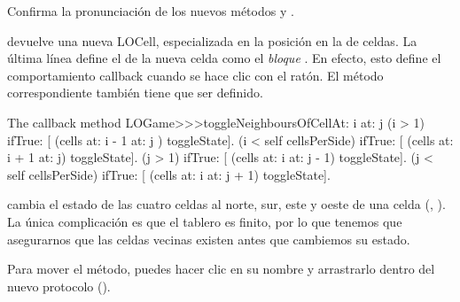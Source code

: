 \documentclass[a4paper,10pt,twoside]{book}
\begin{document}
Confirma la pronunciaci\'on de los nuevos m\'etodos  y .

 devuelve una nueva LOCell, especializada en la posici\'on  en la  de celdas.
La \'ultima l\'inea define el  de la nueva celda como el \emph{bloque}
\mbox{.}
En efecto, esto define el comportamiento callback cuando se hace clic con el rat\'on. 
El m\'etodo correspondiente tambi\'en tiene que ser definido. 

\begin{method}[toggleNeighboursOfCellAt:at:]{The callback method}
LOGame>>>toggleNeighboursOfCellAt: i at: j
   (i > 1) ifTrue: [ (cells at: i - 1 at: j ) toggleState].
   (i < self cellsPerSide) ifTrue: [ (cells at: i + 1 at: j) toggleState].
   (j > 1) ifTrue: [ (cells at: i  at: j - 1) toggleState].
   (j < self cellsPerSide) ifTrue: [ (cells at: i at: j + 1) toggleState].
\end{method}

 cambia el estado de las cuatro celdas al norte, sur, este y oeste de una celda (, ). La \'unica complicaci\'on es que el tablero es finito, por lo que tenemos que asegurarnos que las celdas vecinas existen antes que cambiemos su estado. 

Para mover el m\'etodo, puedes hacer clic en su nombre y arrastrarlo dentro del nuevo protocolo ().
\end{document}
